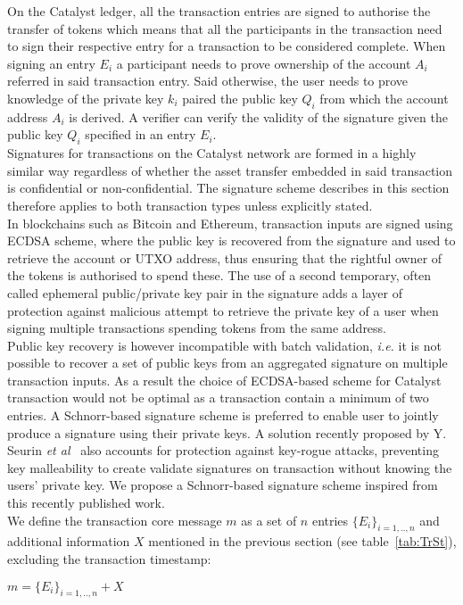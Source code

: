 On the Catalyst ledger, all the transaction entries are signed to authorise the transfer of tokens which means that all the participants in the transaction need to sign their respective entry for a transaction to be considered complete. When signing an entry $E_i$ a participant needs to prove ownership of the account $A_i$ referred in said transaction entry. Said otherwise, the user needs to prove knowledge of the private key $k_i$ paired the public key $Q_i$ from which the account address $A_i$ is derived. A verifier can verify the validity of the signature given the public key $Q_i$ specified in an entry $E_i$.\\

Signatures for transactions on the Catalyst network are formed in a highly similar way regardless of whether the asset transfer embedded in said transaction is confidential or non-confidential. The signature scheme describes in this section therefore applies to both transaction types unless explicitly stated. \\

In blockchains such as Bitcoin and Ethereum, transaction inputs are signed using ECDSA scheme, where the public key is recovered from the signature and used to retrieve the account or UTXO address, thus ensuring that the rightful owner of the tokens is authorised to spend these. The use of a second temporary, often called ephemeral public/private key pair in the signature adds a layer of protection against malicious attempt to retrieve the private key of a user when signing multiple transactions spending tokens from the same address.\\
 
 Public key recovery is however incompatible with batch validation, \textit{i.e.} it is not possible to recover a set of public keys from an aggregated signature on multiple transaction inputs. As a result the choice of ECDSA-based scheme for Catalyst transaction would not be optimal as a transaction contain a minimum of two entries. A Schnorr-based signature scheme is preferred to enable user to jointly produce a signature using their private keys. A solution recently proposed by Y. Seurin \textit{et al}~\cite{schnorr} also accounts for protection against key-rogue attacks, preventing key malleability to create validate signatures on transaction without knowing the users' private key. We propose a Schnorr-based signature scheme inspired from this recently published work. \\

We define the transaction core message $m$ as a set of $n$ entries $\{E_i\}_{i=1,..,n}$ and additional information $X$ mentioned in the previous section (see table~\ref{tab:TrSt}), excluding the transaction timestamp:
\begin{center}
$m = \{E_i\}_{i=1,..,n} + X$ 
\end{center}


